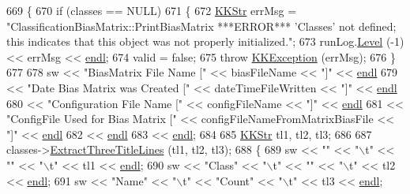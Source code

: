 \begin{DoxyCode}
669 \{
670   \textcolor{keywordflow}{if}  (classes == NULL)
671   \{
672     \hyperlink{class_k_k_b_1_1_k_k_str}{KKStr}  errMsg = \textcolor{stringliteral}{"ClassificationBiasMatrix::PrintBiasMatrix  ***ERROR***   'Classes' not defined; 
       this indicates that this object was not properly initialized."};
673     runLog.\hyperlink{class_k_k_b_1_1_run_log_a32cf761d7f2e747465fd80533fdbb659}{Level} (-1) << errMsg << \hyperlink{namespace_k_k_b_ad1f50f65af6adc8fa9e6f62d007818a8}{endl};
674     valid = \textcolor{keyword}{false};
675     \textcolor{keywordflow}{throw} \hyperlink{class_k_k_b_1_1_k_k_exception}{KKException} (errMsg);
676   \}
677 
678   sw << \textcolor{stringliteral}{"BiasMatrix File Name            ["} << biasFileName                     << \textcolor{stringliteral}{"]"} << 
      \hyperlink{namespace_k_k_b_ad1f50f65af6adc8fa9e6f62d007818a8}{endl}
679      << \textcolor{stringliteral}{"Date Bias Matrix was Created    ["} << dateTimeFileWritten              << \textcolor{stringliteral}{"]"} << 
      \hyperlink{namespace_k_k_b_ad1f50f65af6adc8fa9e6f62d007818a8}{endl}
680      << \textcolor{stringliteral}{"Configuration File Name         ["} << configFileName                   << \textcolor{stringliteral}{"]"} << 
      \hyperlink{namespace_k_k_b_ad1f50f65af6adc8fa9e6f62d007818a8}{endl}
681      << \textcolor{stringliteral}{"ConfigFile Used for Bias Matrix ["} << configFileNameFromMatrixBiasFile << \textcolor{stringliteral}{"]"} << 
      \hyperlink{namespace_k_k_b_ad1f50f65af6adc8fa9e6f62d007818a8}{endl}
682      << \hyperlink{namespace_k_k_b_ad1f50f65af6adc8fa9e6f62d007818a8}{endl}
683      << \hyperlink{namespace_k_k_b_ad1f50f65af6adc8fa9e6f62d007818a8}{endl};
684 
685   \hyperlink{class_k_k_b_1_1_k_k_str}{KKStr}  tl1, tl2, tl3;
686 
687   classes->\hyperlink{class_k_k_m_l_l_1_1_m_l_class_list_ab333df46b706048637bb7b98ef552f59}{ExtractThreeTitleLines} (tl1, tl2, tl3);
688   \{
689     sw << \textcolor{stringliteral}{""}      << \textcolor{stringliteral}{"\(\backslash\)t"} << \textcolor{stringliteral}{""}      << \textcolor{stringliteral}{"\(\backslash\)t"} << tl1 << \hyperlink{namespace_k_k_b_ad1f50f65af6adc8fa9e6f62d007818a8}{endl};
690     sw << \textcolor{stringliteral}{"Class"} << \textcolor{stringliteral}{"\(\backslash\)t"} << \textcolor{stringliteral}{""}      << \textcolor{stringliteral}{"\(\backslash\)t"} << tl2 << \hyperlink{namespace_k_k_b_ad1f50f65af6adc8fa9e6f62d007818a8}{endl};
691     sw << \textcolor{stringliteral}{"Name"}  << \textcolor{stringliteral}{"\(\backslash\)t"} << \textcolor{stringliteral}{"Count"} << \textcolor{stringliteral}{"\(\backslash\)t"} << tl3 << \hyperlink{namespace_k_k_b_ad1f50f65af6adc8fa9e6f62d007818a8}{endl};

\end{DoxyCode}
